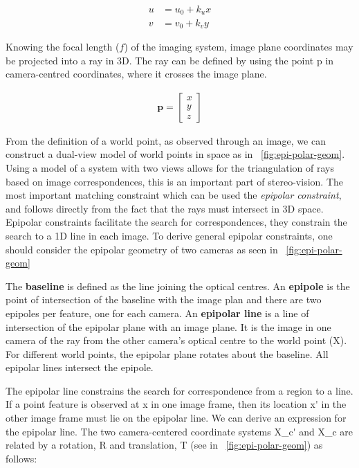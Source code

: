 \begin{align}
    u &= u_0 + k_u x \\
    v &= v_0 + k_v y
\end{align}

Knowing the focal length (\(f\)) of the imaging system, \gls{image plane} coordinates may be projected into a ray in \gls{3D}.
The ray can be defined by using the point \gls{p} in camera-centred coordinates, where it crosses the \gls{image plane}.

\begin{align}
  \mathbf{p} = \begin{bmatrix}
        x\\y\\z
      \end{bmatrix}
\end{align}

From the definition of a \gls{world point}, as observed through an image, we can construct a dual-view model of \gls{world point}s in space as in \figurename~\ref{fig:epi-polar-geom}.
Using a model of a system with two views allows for the triangulation of rays based on image correspondences, this is an important part of stereo-vision.
The most important matching constraint which can be used the \emph{epipolar constraint}, and follows directly from the fact that the rays must intersect in 3D space.
Epipolar constraints facilitate the search for correspondences, they constrain the search to a 1D line in each image.
To derive general epipolar constraints, one should consider the epipolar geometry of two cameras as seen in \figurename~\ref{fig:epi-polar-geom}


The \textbf{baseline} is defined as the line joining the optical centres.
An \textbf{epipole} is the point of intersection of the baseline with the image plan and there are two epipoles per feature, one for each camera.
An \textbf{epipolar line} is a line of intersection of the epipolar plane with an image plane.
It is the image in one camera of the ray from the other camera’s optical centre to the \gls{world point} (\gls{X}).
For different \gls{world point}s, the epipolar plane rotates about the baseline.
All epipolar lines intersect the epipole.

The epipolar line constrains the search for correspondence from a region to a line.
If a point feature is observed at \gls{x} in one image frame, then its location \gls{x'} in the other image frame must lie on the epipolar line.
We can derive an expression for the epipolar line.
The two camera-centered coordinate systems \gls{X_c'} and \gls{X_c} are related by a rotation, \gls{R} and translation, \gls{T} (see in \figurename~\ref{fig:epi-polar-geom}) as follows:

